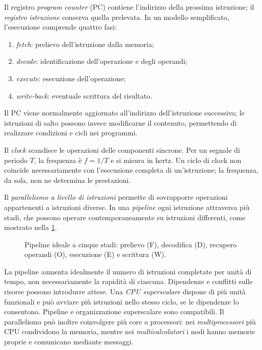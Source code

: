 \clearpage

Il registro \emph{program counter} (PC) contiene l'indirizzo della
prossima istruzione; il \emph{registro istruzione} conserva quella
prelevata. In un modello semplificato, l'esecuzione comprende quattro fasi:
\begin{enumerate}
  \item \emph{fetch}: prelievo dell'istruzione dalla memoria;
  \item \emph{decode}: identificazione dell'operazione e degli operandi;
  \item \emph{execute}: esecuzione dell'operazione;
  \item \emph{write-back}: eventuale scrittura del risultato.
\end{enumerate}
Il PC viene normalmente aggiornato all'indirizzo dell'istruzione
successiva; le istruzioni di salto possono invece modificarne il
contenuto, permettendo di realizzare condizioni e cicli nei programmi.

Il \emph{clock} scandisce le operazioni delle componenti sincrone.
Per un segnale di periodo \(T\), la frequenza è \(f=1/T\) e si misura
in hertz. Un ciclo di clock non coincide necessariamente con
l'esecuzione completa di un'istruzione; la frequenza, da sola, non
ne determina le prestazioni.

Il \emph{parallelismo a livello di istruzioni} permette di
sovrapporre operazioni appartenenti a istruzioni diverse.
In una \emph{pipeline} ogni istruzione attraversa più stadi, che
possono operare contemporaneamente su istruzioni differenti,
come mostrato nella \cref{fig:fi-pipeline}.

\begin{figure}[htbp]
  \centering
  
  \caption{Pipeline ideale a cinque stadi: prelievo (F), decodifica (D),
  recupero operandi (O), esecuzione (E) e scrittura (W).}
  \label{fig:fi-pipeline}
\end{figure}

La pipeline aumenta idealmente il numero di istruzioni completate
per unità di tempo, non necessariamente la rapidità di ciascuna.
Dipendenze e conflitti sulle risorse possono introdurre attese.
Una \emph{CPU superscalare} dispone di più unità funzionali e può
avviare più istruzioni nello stesso ciclo, se le dipendenze lo
consentono. Pipeline e organizzazione superscalare sono compatibili.
Il parallelismo può inoltre coinvolgere più core o processori:
nei \emph{multiprocessori} più CPU condividono la memoria, mentre nei
\emph{multicalcolatori} i nodi hanno memorie proprie e comunicano
mediante messaggi.

